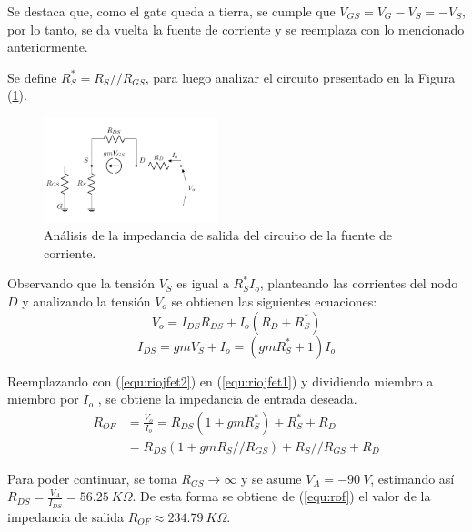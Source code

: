Se destaca que, como el gate queda a tierra, se cumple que $V_{GS} = V_G - V_S = - V_S$, por lo tanto, se da vuelta la fuente de corriente y se reemplaza con lo mencionado anteriormente. 

Se define $R_S^* = R_S // R_{GS}$, para luego analizar el circuito presentado en la Figura (\ref{fig:incfuente2}).
\begin{figure}[H]
\centering
\hspace*{2cm}
	\includegraphics[width=0.45\textwidth, page=2]{Imagenes/ModeloIncremental.pdf}
	\caption{Análisis de la impedancia de salida del circuito de la fuente de corriente.}
\label{fig:incfuente2}
\end{figure}

Observando que la tensión $V_S$ es igual a $R_{S}^{*} I_o$, planteando las corrientes del nodo $D$ y analizando la tensión $V_o$ se obtienen las siguientes ecuaciones:
\begin{equation}
	V_o = I_{DS} R_{DS} + I_o \left( R_D + R_S^* \right)
	\label{equ:riojfet1}
\end{equation}
\begin{equation}
	I_{DS} = gm V_S + I_o = \left( gm R_S^* + 1 \right) I_o
	\label{equ:riojfet2}
\end{equation}

Reemplazando con (\ref{equ:riojfet2}) en (\ref{equ:riojfet1}) y dividiendo miembro a miembro por $I_o$ , se obtiene la impedancia de entrada deseada.
\begin{equation}
\begin{split}
	R_{OF} & = \frac{V_o}{I_o} = R_{DS} \left( 1 + gm R_S^* \right) + R_S^* + R_D \\
		   & = R_{DS} \left( 1 + gm R_S//R_{GS} \right) + R_S//R_{GS} + R_D
\end{split}
\label{equ:rof}
\end{equation}

Para poder continuar, se toma $R_{GS} \longrightarrow \infty$ y se asume $V_A = -90 \ V$, estimando así $R_{DS} = \frac{V_A}{I_{DS}} = 56.25 \ K\Omega$. De esta forma se obtiene de (\ref{equ:rof}) el valor de la impedancia de salida $R_{OF} \approx 234.79 \ K\Omega$.

